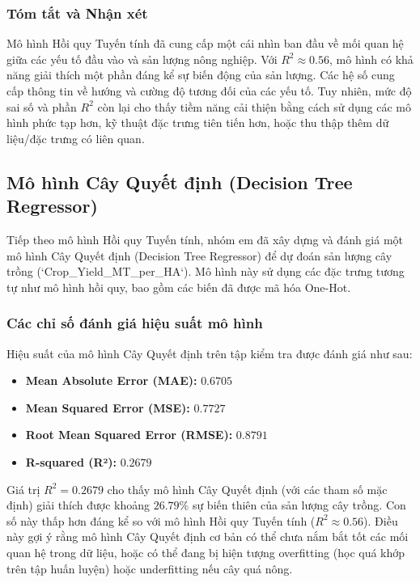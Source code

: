 \subsubsection{Tóm tắt và Nhận xét}
Mô hình Hồi quy Tuyến tính đã cung cấp một cái nhìn ban đầu về mối quan hệ giữa các yếu tố đầu vào và sản lượng nông nghiệp. Với $R^2 \approx 0.56$, mô hình có khả năng giải thích một phần đáng kể sự biến động của sản lượng. Các hệ số cung cấp thông tin về hướng và cường độ tương đối của các yếu tố. Tuy nhiên, mức độ sai số và phần $R^2$ còn lại cho thấy tiềm năng cải thiện bằng cách sử dụng các mô hình phức tạp hơn, kỹ thuật đặc trưng tiên tiến hơn, hoặc thu thập thêm dữ liệu/đặc trưng có liên quan.





\subsection{ Mô hình Cây Quyết định (Decision Tree Regressor)}
\label{subsec:decision_tree_results}

Tiếp theo mô hình Hồi quy Tuyến tính, nhóm em đã xây dựng và đánh giá một mô hình Cây Quyết định (Decision Tree Regressor) để dự đoán sản lượng cây trồng (`Crop\_Yield\_MT\_per\_HA`). Mô hình này sử dụng các đặc trưng tương tự như mô hình hồi quy, bao gồm các biến đã được mã hóa One-Hot.

\subsubsection{Các chỉ số đánh giá hiệu suất mô hình}
\label{subsubsec:dt_performance_metrics}

Hiệu suất của mô hình Cây Quyết định trên tập kiểm tra được đánh giá như sau:
\begin{itemize}
    \item \textbf{Mean Absolute Error (MAE):} $0.6705$
    \item \textbf{Mean Squared Error (MSE):} $0.7727$
    \item \textbf{Root Mean Squared Error (RMSE):} $0.8791$
    \item \textbf{R-squared (R²):} $0.2679$
\end{itemize}

Giá trị $R^2 = 0.2679$ cho thấy mô hình Cây Quyết định (với các tham số mặc định) giải thích được khoảng $26.79\%$ sự biến thiên của sản lượng cây trồng. Con số này thấp hơn đáng kể so với mô hình Hồi quy Tuyến tính ($R^2 \approx 0.56$). Điều này gợi ý rằng mô hình Cây Quyết định cơ bản có thể chưa nắm bắt tốt các mối quan hệ trong dữ liệu, hoặc có thể đang bị hiện tượng overfitting (học quá khớp trên tập huấn luyện) hoặc underfitting nếu cây quá nông.

